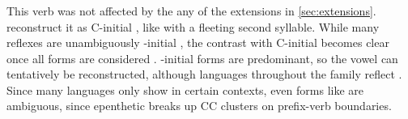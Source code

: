 \subsubsection{ }
\label{sec:go}
This verb was not affected by the any of the extensions in \cref{sec:extensions}.
\textcite{gildea2007greenberg} reconstruct it as C-initial , like   with a fleeting second syllable.
While many reflexes are unambiguously -initial , the contrast with C-initial  becomes clear once all forms are considered .
-initial forms are predominant, so the vowel can tentatively be reconstructed, although languages throughout the family reflect .
Since many languages only show  in certain contexts, even forms like \trio {}  \parencite[43]{triomeira1999} are ambiguous, since epenthetic  breaks up CC clusters on prefix-verb boundaries.





%

